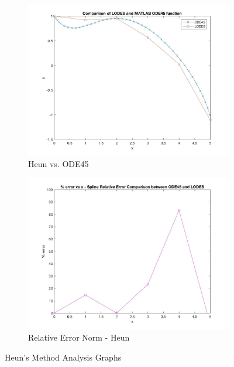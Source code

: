 \documentclass[12pt, titlepage]{article}
\begin{document}
\begin{figure}[H]
\centering
\begin{subfigure}{.55\textwidth}
  \centering
  \includegraphics[width=\linewidth]{images/Test4/3LODESvsMATLABPlot.jpg}
  \caption{Heun vs. ODE45}
  \label{fig:heun4a}
\end{subfigure}%
\begin{subfigure}{.55\textwidth}
  \centering
  \includegraphics[width=\linewidth]{images/Test4/3RelativeErrorPlot.jpg}
  \caption{Relative Error Norm - Heun}
  \label{fig:heun4b}
\end{subfigure}
\caption{Heun's Method Analysis Graphs}
\label{fig:heun4}
\end{figure}
\end{document}
